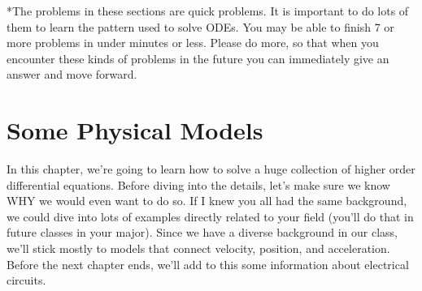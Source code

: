 *The problems in these sections are quick problems. It is important to do lots of them to learn the pattern used to solve ODEs. You may be able to finish 7 or more problems in under minutes or less.  Please do more, so that when you encounter these kinds of problems in the future you can immediately give an answer and move forward.


\section{Some Physical Models}
In this chapter, we're going to learn how to solve a huge collection of higher order differential equations.  Before diving into the details, let's make sure we know WHY we would even want to do so. If I knew you all had the same background, we could dive into lots of examples directly related to your field (you'll do that in future classes in your major).  Since we have a diverse background in our class, we'll stick mostly to models that connect velocity, position, and acceleration.  Before the next chapter ends, we'll add to this some information about electrical circuits.


